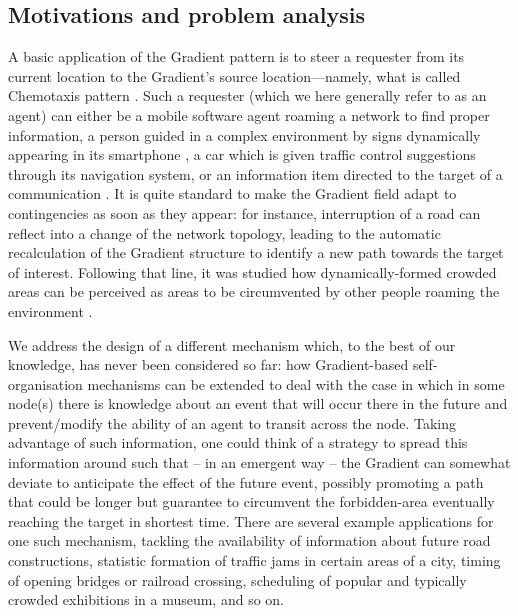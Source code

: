 \documentclass[12pt,a4paper,twoside,openright]{book}
\begin{document}
\subsection{Motivations and problem analysis}

A basic application of the Gradient pattern is to steer a requester from its current location to the Gradient's source location---namely, what is called Chemotaxis pattern \cite{FDMVA-NACO2012}.
%
Such a requester (which we here generally refer to as an agent) can either be a mobile software agent roaming a network to find proper information, a person guided in a complex environment by signs dynamically appearing in its smartphone \cite{mass2011}, a car which is given traffic control suggestions through its navigation system, or an information item directed to the target of a communication \cite{VCMZ-TAAS2011}.
%
It is quite standard to make the Gradient field adapt to contingencies as soon as they appear: for instance, interruption of a road can reflect into a change of the network topology, leading to the automatic recalculation of the Gradient structure to identify a new path towards the target of interest.
%
Following that line, it was studied how dynamically-formed crowded areas can be perceived as areas to be circumvented by other people roaming the environment \cite{sapereecolaws-sac2012}.

We address the design of a different mechanism which, to the best of our knowledge, has never been considered so far: how Gradient-based self-organisation mechanisms can be extended to deal with the case in which in some node(s) there is knowledge about an event that will occur there in the future and prevent/modify the ability of an agent to transit across the node.
%
Taking advantage of such information, one could think of a strategy to spread this information around such that -- in an emergent way -- the Gradient can somewhat deviate to anticipate the effect of the future event, possibly promoting a path that could be longer but guarantee to circumvent the forbidden-area eventually reaching the target in shortest time.
%
There are several example applications for one such mechanism, tackling the availability of information about future road constructions, statistic formation of traffic jams in certain areas of a city, timing of opening bridges or railroad crossing, scheduling of popular and typically crowded exhibitions in a museum, and so on.
\end{document}
